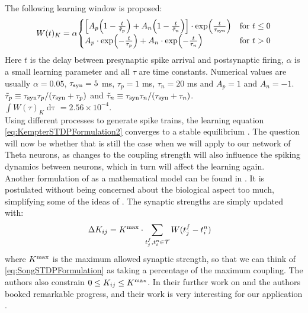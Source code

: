The following learning window is proposed:
\begin{align}
W(t)_K = \alpha
\begin{cases}
\left[A_{p}\left(1-\frac{t}{\tilde{\tau}_{p}}\right)+A_{n}\left(1-\frac{t}{\tilde{\tau}_{n}}\right)\right] \cdot \exp \left( \frac{t}{\tau_{\rm syn}} \right) & \text{for } t \leq 0 \\
A_{p} \cdot \exp \left(-\frac{t}{\tau_{p}}\right) + A_{n} \cdot \exp \left(-\frac{t}{\tau_{n}} \right) & \text{for } t > 0
\end{cases} \label{eq:learningwindowKempter1999}
\end{align}
Here $t$ is the delay between presynaptic spike arrival and postsynaptic firing, $\alpha$ is a small learning parameter and all $\tau$ are time constants. Numerical values are usually  $\alpha = 0.05$, $\tau_{\rm syn} = 5$ ms, $\tau_{p} = 1$ ms, $\tau_{n} = 20$ ms and $A_p = 1$ and $A_{n} = -1$. $\tilde{\tau}_{p} \equiv \tau_{\rm syn} \tau_{p} / (\tau_{\rm syn} + \tau_{p})$ and $\tilde{\tau}_{n} \equiv \tau_{\rm syn} \tau_{n} / (\tau_{\rm syn} + \tau_{n})$. \\
$\int W(\tau)_K \mathop{d \tau} = 2.56 \times 10^{-4}$. \\

Using different processes to generate spike trains, the learning equation \eqref{eq:KempterSTDPFormulation2} converges to a stable equilibrium \cite{Kempter1999}. The question will now be whether that is still the case when we will apply \STDP to our network of Theta neurons, as changes to the coupling strength will also influence the spiking dynamics between neurons, which in turn will affect the learning again.\\

Another formulation of \STDP as a mathematical model can be found in \cite{Song2000}. It is postulated without being concerned about the biological aspect too much, simplifying some of the ideas of \cite{Kempter1999}. The synaptic strengths are simply updated with:
\begin{align}
\Delta K_{ij} &= K^{\rm max} \cdot \sum_{t_{j}^{f}, t_i^{n} \in \mathcal{T}} W (t_{j}^{f}-t_i^{n} ) \label{eq:SongSTDPFormulation}
\end{align}
where $K^{\rm max}$ is the maximum allowed synaptic strength, so that we can think of \eqref{eq:SongSTDPFormulation} as taking a percentage of the maximum coupling. The authors also constrain $0 \leq K_{ij} \leq K^{\rm max}$. In their further work on \STDP and \IP the authors booked remarkable progress, and their work is very interesting for our application \cite{Song2017}. \\

